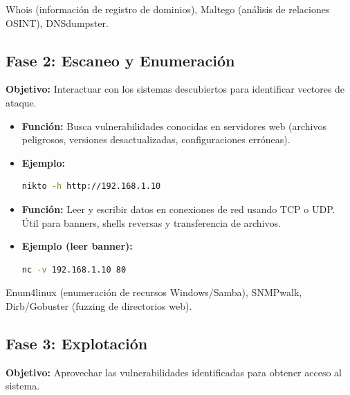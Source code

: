\documentclass[11pt,a4paper]{article}
\begin{document}
\begin{herramienta}
Whois (información de registro de dominios), Maltego (análisis de relaciones OSINT), DNSdumpster.
\end{herramienta}

\subsection{Fase 2: Escaneo y Enumeración}
\textbf{Objetivo:} Interactuar con los sistemas descubiertos para identificar vectores de ataque.

\begin{herramienta}
\begin{itemize}[leftmargin=*]
  \item \textbf{Función:} Busca vulnerabilidades conocidas en servidores web (archivos peligrosos, versiones desactualizadas, configuraciones erróneas).
  \item \textbf{Ejemplo:}
  \begin{lstlisting}[language=bash]
nikto -h http://192.168.1.10
  \end{lstlisting}
\end{itemize}
\end{herramienta}

\begin{herramienta}
\begin{itemize}[leftmargin=*]
  \item \textbf{Función:} Leer y escribir datos en conexiones de red usando TCP o UDP. Útil para banners, shells reversas y transferencia de archivos.
  \item \textbf{Ejemplo (leer banner):}
  \begin{lstlisting}[language=bash]
nc -v 192.168.1.10 80
  \end{lstlisting}
\end{itemize}
\end{herramienta}

\begin{herramienta}
Enum4linux (enumeración de recursos Windows/Samba), SNMPwalk, Dirb/Gobuster (fuzzing de directorios web).
\end{herramienta}

\subsection{Fase 3: Explotación}
\textbf{Objetivo:} Aprovechar las vulnerabilidades identificadas para obtener acceso al sistema.
\end{document}
